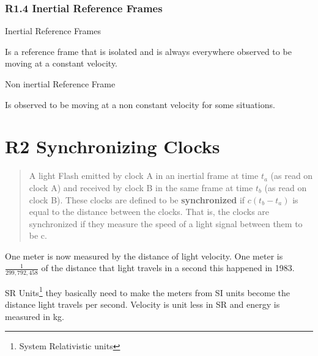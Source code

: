 \documentclass[twocolumn]{report}
\begin{document}
\subsection{R1.4 Inertial Reference Frames}

Inertial Reference Frames

Is a reference frame that is isolated and is always everywhere observed to be moving at a constant velocity.

Non inertial Reference Frame

Is observed to be moving at a non constant velocity for some situations. 

\chapter{R2 Synchronizing Clocks}

\begin{quote}
    A light Flash emitted by clock A in an inertial frame at time $t_a$ (as read on clock A) and received by clock B in the same frame at time $t_b$ (as read on clock B). These clocks are defined to be \textbf{synchronized} if $c(t_b - t_a)$ is equal to the distance between the clocks. That is, the clocks are synchronized if they measure the speed of a light signal between them to be c. \cite{moore2002six}
\end{quote}

One meter is now measured by the distance of light velocity. One meter is $\frac{1}{299,792,458}$ of the distance that light travels in a second this happened in 1983. 

SR Units\footnote{System Relativistic units} they basically need to make the meters from SI units become the distance light travels per second. Velocity is unit less in SR and energy is measured in kg. 



\end{document}
